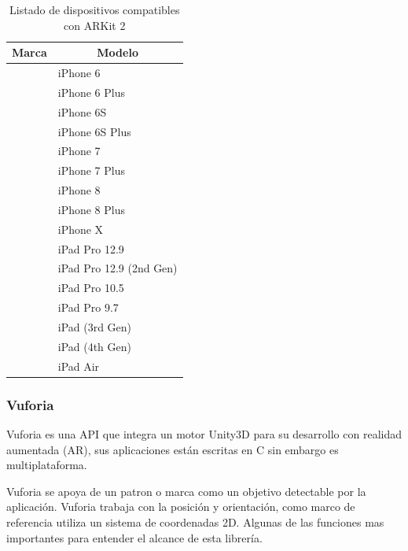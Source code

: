\clearpage
\begin{table}[]
	\begin{tabular}{| p{4.5cm} | p{10.5cm} |}
		\hline \centering
		\textbf{Marca}              & \multicolumn{1}{c|}{\textbf{Modelo}}               \\ \hline \centering
		\multirow{16}{*}{Apple}       & iPhone 6     \\ \cline{2-2}  
		& iPhone 6 Plus                                 \\ \cline{2-2}
		& iPhone 6S                                     \\ \cline{2-2}
		& iPhone 6S Plus                                \\ \cline{2-2}
		& iPhone 7                                      \\ \cline{2-2}
		& iPhone 7 Plus                                 \\ \cline{2-2}
		& iPhone 8                                      \\ \cline{2-2}
		& iPhone 8 Plus                                 \\ \cline{2-2}
		& iPhone X                                      \\ \cline{2-2}
		& iPad Pro 12.9                                 \\ \cline{2-2}
		& iPad Pro 12.9 (2nd Gen)                       \\ \cline{2-2}
		& iPad Pro 10.5                                 \\ \cline{2-2}
		& iPad Pro 9.7                                  \\ \cline{2-2}
		& iPad (3rd Gen)	                              \\ \cline{2-2}
		& iPad (4th Gen)	                              \\ \cline{2-2}
		& iPad Air                                      \\ \cline{2-2}
		\hline 
	\end{tabular}
	\captionsetup{justification=centering}
	\caption{Listado de dispositivos compatibles con ARKit 2}
\end{table}
\noindent
\subsubsection{Vuforia}
Vuforia es una API que integra un motor Unity3D para su desarrollo con realidad aumentada (AR), sus aplicaciones están escritas en C sin embargo es multiplataforma.\par
Vuforia se apoya de un patron o marca como un objetivo detectable por la aplicación. Vuforia trabaja con la posición y orientación, como marco de referencia utiliza un sistema de coordenadas 2D. Algunas de las funciones mas importantes para entender el alcance de esta librería. \cite{B12} 

